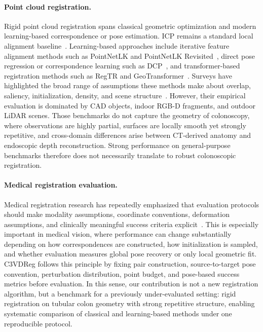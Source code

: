 \documentclass{bmvc2k}
\begin{document}
\paragraph{Point cloud registration.}
Rigid point cloud registration spans classical geometric optimization and modern learning-based correspondence or pose estimation. ICP remains a standard local alignment baseline~\cite{besl1992method}. Learning-based approaches include iterative feature alignment methods such as PointNetLK and PointNetLK Revisited~\cite{aoki2019pointnetlk,li2021pointnetlk}, direct pose regression or correspondence learning such as DCP~\cite{wang2019deep}, and transformer-based registration methods such as RegTR and GeoTransformer~\cite{yew2022regtr,qin2022geometric}. Surveys have highlighted the broad range of assumptions these methods make about overlap, saliency, initialization, density, and scene structure~\cite{pomerleau2015review,huang2021comprehensive}. However, their empirical evaluation is dominated by CAD objects, indoor RGB-D fragments, and outdoor LiDAR scenes. Those benchmarks do not capture the geometry of colonoscopy, where observations are highly partial, surfaces are locally smooth yet strongly repetitive, and cross-domain differences arise between CT-derived anatomy and endoscopic depth reconstruction. Strong performance on general-purpose benchmarks therefore does not necessarily translate to robust colonoscopic registration.

\paragraph{Medical registration evaluation.}
Medical registration research has repeatedly emphasized that evaluation protocols should make modality assumptions, coordinate conventions, deformation assumptions, and clinically meaningful success criteria explicit~\cite{maier2013optical,haskins2020deep}. This is especially important in medical vision, where performance can change substantially depending on how correspondences are constructed, how initialization is sampled, and whether evaluation measures global pose recovery or only local geometric fit. C3VDReg follows this principle by fixing pair construction, source-to-target pose convention, perturbation distribution, point budget, and pose-based success metrics before evaluation. In this sense, our contribution is not a new registration algorithm, but a benchmark for a previously under-evaluated setting: rigid registration on tubular colon geometry with strong repetitive structure, enabling systematic comparison of classical and learning-based methods under one reproducible protocol.
\end{document}
